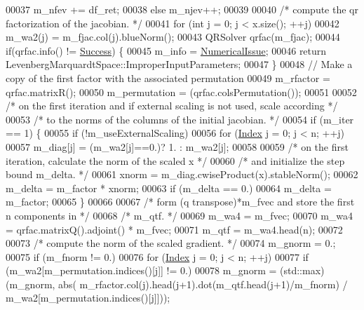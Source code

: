 \begin{DoxyCode}
00037       m\_nfev += df\_ret;
00038   \textcolor{keywordflow}{else} m\_njev++;
00039 
00040   \textcolor{comment}{/* compute the qr factorization of the jacobian. */}
00041   \textcolor{keywordflow}{for} (\textcolor{keywordtype}{int} j = 0; j < x.size(); ++j)
00042     m\_wa2(j) = m\_fjac.col(j).blueNorm();
00043   QRSolver qrfac(m\_fjac);
00044   \textcolor{keywordflow}{if}(qrfac.info() != \hyperlink{group__enums_gga85fad7b87587764e5cf6b513a9e0ee5ea52581b035f4b59c203b8ff999ef5fcea}{Success}) \{
00045     m\_info = \hyperlink{group__enums_gga85fad7b87587764e5cf6b513a9e0ee5eaaf9b736d310a664e7729d163a035cc5f}{NumericalIssue};
00046     \textcolor{keywordflow}{return} LevenbergMarquardtSpace::ImproperInputParameters;
00047   \}
00048   \textcolor{comment}{// Make a copy of the first factor with the associated permutation}
00049   m\_rfactor = qrfac.matrixR();
00050   m\_permutation = (qrfac.colsPermutation());
00051 
00052   \textcolor{comment}{/* on the first iteration and if external scaling is not used, scale according */}
00053   \textcolor{comment}{/* to the norms of the columns of the initial jacobian. */}
00054   \textcolor{keywordflow}{if} (m\_iter == 1) \{
00055       \textcolor{keywordflow}{if} (!m\_useExternalScaling)
00056           \textcolor{keywordflow}{for} (\hyperlink{namespace_eigen_a62e77e0933482dafde8fe197d9a2cfde}{Index} j = 0; j < n; ++j)
00057               m\_diag[j] = (m\_wa2[j]==0.)? 1. : m\_wa2[j];
00058 
00059       \textcolor{comment}{/* on the first iteration, calculate the norm of the scaled x */}
00060       \textcolor{comment}{/* and initialize the step bound m\_delta. */}
00061       xnorm = m\_diag.cwiseProduct(x).stableNorm();
00062       m\_delta = m\_factor * xnorm;
00063       \textcolor{keywordflow}{if} (m\_delta == 0.)
00064           m\_delta = m\_factor;
00065   \}
00066 
00067   \textcolor{comment}{/* form (q transpose)*m\_fvec and store the first n components in */}
00068   \textcolor{comment}{/* m\_qtf. */}
00069   m\_wa4 = m\_fvec;
00070   m\_wa4 = qrfac.matrixQ().adjoint() * m\_fvec; 
00071   m\_qtf = m\_wa4.head(n);
00072 
00073   \textcolor{comment}{/* compute the norm of the scaled gradient. */}
00074   m\_gnorm = 0.;
00075   \textcolor{keywordflow}{if} (m\_fnorm != 0.)
00076       \textcolor{keywordflow}{for} (\hyperlink{namespace_eigen_a62e77e0933482dafde8fe197d9a2cfde}{Index} j = 0; j < n; ++j)
00077           \textcolor{keywordflow}{if} (m\_wa2[m\_permutation.indices()[j]] != 0.)
00078               m\_gnorm = (std::max)(m\_gnorm, abs( m\_rfactor.col(j).head(j+1).dot(m\_qtf.head(j+1)/m\_fnorm) / 
      m\_wa2[m\_permutation.indices()[j]]));

\end{DoxyCode}
